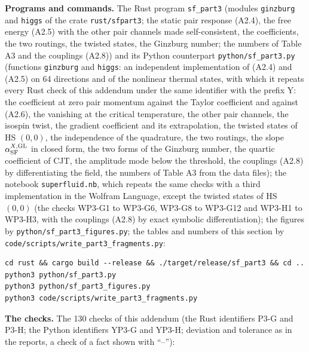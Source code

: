 \documentclass[
  10pt,
]{article}
\begin{document}
\textbf{Programs and commands.} The Rust program \texttt{sf\_part3}
(modules \texttt{ginzburg} and \texttt{higgs} of the crate
\texttt{rust/sfpart3}; the static pair response (A2.4), the free energy
(A2.5) with the other pair channels made self-consistent, the
coefficients, the two routings, the twisted states, the Ginzburg number;
the numbers of Table A3 and the couplings (A2.8)) and its Python
counterpart \texttt{python/sf\_part3.py} (functions \texttt{ginzburg}
and \texttt{higgs}: an independent implementation of (A2.4) and (A2.5)
on 64 directions and of the nonlinear thermal states, with which it
repeats every Rust check of this addendum under the same identifier with
the prefix Y: the coefficient at zero pair momentum against the Taylor
coefficient and against (A2.6), the vanishing at the critical
temperature, the other pair channels, the isospin twist, the gradient
coefficient and its extrapolation, the twisted states of HS \((0,0)\),
the independence of the quadrature, the two routings, the slope
\(\alpha^{X,{\rm GL}}_{\rm SF}\) in closed form, the two forms of the
Ginzburg number, the quartic coefficient of CJT, the amplitude mode
below the threshold, the couplings (A2.8) by differentiating the field,
the numbers of Table A3 from the data files); the notebook
\texttt{superfluid.nb}, which repeats the same checks with a third
implementation in the Wolfram Language, except the twisted states of HS
\((0,0)\) (the checks WP3-G1 to WP3-G6, WP3-G8 to WP3-G12 and WP3-H1 to
WP3-H3, with the couplings (A2.8) by exact symbolic differentiation);
the figures by \texttt{python/sf\_part3\_figures.py}; the tables and
numbers of this section by
\texttt{code/scripts/write\_part3\_fragments.py}:

\begin{verbatim}
cd rust && cargo build --release && ./target/release/sf_part3 && cd ..
python3 python/sf_part3.py
python3 python/sf_part3_figures.py
python3 code/scripts/write_part3_fragments.py
\end{verbatim}

\textbf{The checks.} The 130 checks of this addendum (the Rust
identifiers P3-G and P3-H; the Python identifiers YP3-G and YP3-H;
deviation and tolerance as in the reports, a check of a fact shown with
``--''):
\end{document}
